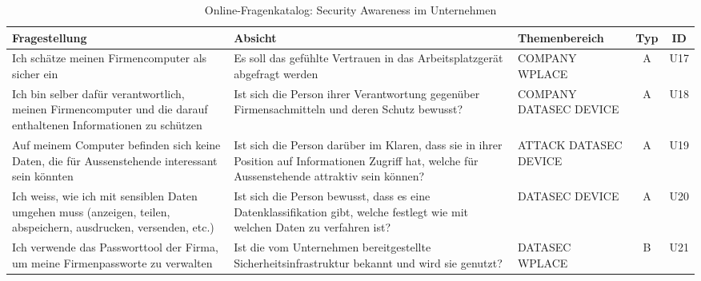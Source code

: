 \documentclass[../../main.tex]{subfiles}
\begin{document}

\sloppy 

\begin{table}[H]
\tablefontsize	
\centering
\caption{Online-Fragenkatalog: Security Awareness im Unternehmen}
\label{Security Awareness im Unternehmen}
\begin{tabular}{ |p{5.5cm}|p{5.5cm}|p{2.5cm}|c|c|}

\hline
\tableheaderbgcolor
\textbf{Fragestellung} & \textbf{Absicht} & \textbf{Themenbereich} & \textbf{Typ} & \textbf{ID}\\ 
\hline
Ich schätze meinen Firmencomputer \newline als sicher ein & Es soll das gefühlte Vertrauen in das Arbeitsplatzgerät abgefragt werden & COMPANY \newline WPLACE & A & U17 \\
\hline

Ich bin selber dafür verantwortlich, meinen Firmencomputer und die darauf enthaltenen Informationen zu schützen & Ist sich die Person ihrer Verantwortung gegenüber Firmensachmitteln und deren Schutz bewusst? & COMPANY \newline DATASEC \newline DEVICE & A & U18 \\
\hline

Auf meinem Computer befinden sich keine Daten, die für Aussenstehende interessant sein könnten & Ist sich die Person darüber im Klaren, dass sie in ihrer Position auf Informationen Zugriff hat, welche für Aussenstehende attraktiv sein können? & ATTACK \newline DATASEC \newline DEVICE & A & U19 \\
\hline

Ich weiss, wie ich mit sensiblen Daten umgehen muss (anzeigen, teilen, abspeichern, ausdrucken, versenden, etc.) & Ist sich die Person bewusst, dass es eine Datenklassifikation gibt, welche festlegt wie mit welchen Daten zu verfahren ist? & DATASEC \newline DEVICE & A & U20 \\
\hline

Ich verwende das Passworttool der Firma, um meine Firmenpassworte zu verwalten & Ist die vom Unternehmen bereitgestellte Sicherheitsinfrastruktur bekannt und wird sie genutzt? & DATASEC \newline WPLACE & B & U21 \\
\hline


\end{tabular}
\end{table}
\end{document}
